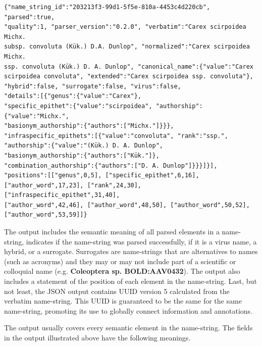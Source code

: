 \documentclass{bmcart}
\begin{document}
\begin{Verbatim}[fontsize=\small]
{"name_string_id":"203213f3-99d1-5f5e-810a-4453c4d220cb", "parsed":true,
"quality":1, "parser_version":"0.2.0", "verbatim":"Carex scirpoidea Michx.
subsp. convoluta (Kük.) D.A. Dunlop", "normalized":"Carex scirpoidea Michx.
ssp. convoluta (Kük.) D. A. Dunlop", "canonical_name":{"value":"Carex
scirpoidea convoluta", "extended":"Carex scirpoidea ssp. convoluta"},
"hybrid":false, "surrogate":false, "virus":false,
"details":[{"genus":{"value":"Carex"},
"specific_epithet":{"value":"scirpoidea", "authorship":{"value":"Michx.",
"basionym_authorship":{"authors":["Michx."]}}},
"infraspecific_epithets":[{"value":"convoluta", "rank":"ssp.",
"authorship":{"value":"(Kük.) D. A. Dunlop",
"basionym_authorship":{"authors":["Kük."]},
"combination_authorship":{"authors":["D. A. Dunlop"]}}}]}],
"positions":[["genus",0,5], ["specific_epithet",6,16],
["author_word",17,23], ["rank",24,30], ["infraspecific_epithet",31,40],
["author_word",42,46], ["author_word",48,50], ["author_word",50,52],
["author_word",53,59]]}
\end{Verbatim}

\vspace{0.5cm}

The output includes the semantic meaning of all parsed elements in a name-string,
indicates if the name-string was parsed successfully, if it is a virus name, a
hybrid, or a surrogate. Surrogates are name-strings that are alternatives to
names (such as acronyms) and they may or may not include part of a scientific or
colloquial name (e.g. \textbf{Coleoptera sp. BOLD:AAV0432}). The output also
includes a statement of the position of each element in the name-string.  Last, but not least, the JSON output
contains UUID version 5 calculated from the verbatim name-string. This UUID is
guaranteed to be the same for the same name-string, promoting its use to
globally connect information and annotations.

The output usually covers every semantic element in the name-string.  The fields in the  output illustrated above have the following meanings. 
\end{document}
